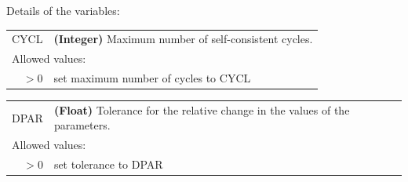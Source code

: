 \documentclass[10pt,a4paper,openany]{memoir}
\numberwithin{equation}{section}
\begin{document}
\noindent Details of the variables:
\vspace{2ex}


{
\begin{tabular}{r@{ : }l}
\label{descr:cycl}
   CYCL &\textbf{(Integer)} Maximum number of self-consistent cycles.                                  \\ 
\multicolumn{2}{l}{Allowed values:} \\ 
    \(>0\)& set maximum number of cycles to CYCL                                    \\ 
\end{tabular}
\vspace{1ex}
}

{
\begin{tabular}{r@{ : }l}
\label{descr:dpar}
   DPAR&\textbf{(Float)} Tolerance for the relative change in the values of the parameters.                                                                           \\ 
\multicolumn{2}{l}{Allowed values:} \\ 
    \(>0\)&set tolerance to DPAR         \\ 
\end{tabular}
\vspace{1ex}
}
\end{document}
